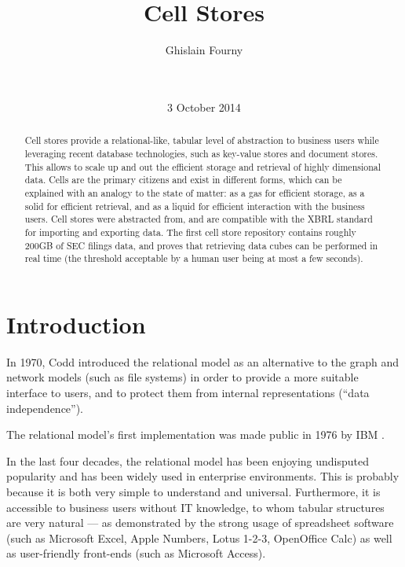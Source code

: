\documentclass{acm_proc_article-sp}
\begin{document}
\title{Cell Stores}


\author{
\alignauthor
Ghislain Fourny\\
       \\
       \\
}
\date{3 October 2014}
\maketitle

\begin{abstract}
Cell stores provide a relational-like, tabular level of abstraction to business users while leveraging recent database technologies, such as key-value stores and document stores. This allows to scale up and out the efficient storage and retrieval of highly dimensional data. Cells are the primary citizens and exist in different forms, which can be explained with an analogy to the state of matter: as a gas for efficient storage, as a solid for efficient retrieval, and as a liquid for efficient interaction with the business users. Cell stores were abstracted from, and are compatible with the XBRL standard for importing and exporting data. The first cell store repository contains roughly 200GB of SEC filings data, and proves that retrieving data cubes can be performed in real time (the threshold acceptable by a human user being at most a few seconds).
\end{abstract}


\section{Introduction}
In 1970, Codd \cite{Codd1970} introduced the relational model as an alternative to the graph and network models (such as file systems) in order to provide a more suitable interface to users, and to protect them from internal representations (``data independence'').

The relational model's first implementation was made public in 1976 by IBM \cite{Astrahan1976}.

In the last four decades, the relational model has been enjoying undisputed popularity and has been widely used in enterprise environments. This is probably because it is both very simple to understand and universal. Furthermore, it is accessible to business users without IT knowledge, to whom tabular structures are very natural --- as demonstrated by the strong usage of spreadsheet software \cite{Mattessich1958} \cite{Mattessich1961} (such as Microsoft Excel, Apple Numbers, Lotus 1-2-3, OpenOffice Calc) as well as user-friendly front-ends (such as Microsoft Access).
\end{document}
